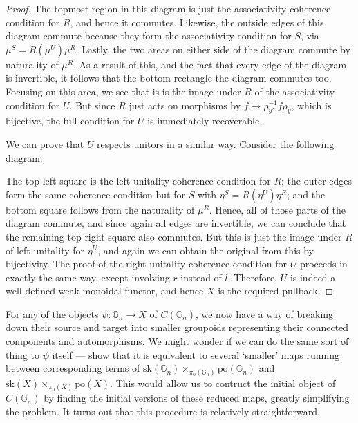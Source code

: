 \documentclass{amsart} %
\newenvironment{eq*}{\begin{equation*}}{\end{equation*}}
\begin{document}
\begin{proof}
The topmost region in this diagram is just the associativity coherence condition for $R$, and hence it commutes. Likewise, the outside edges of this diagram commute because they form the associativity condition for $S$, via $\mu^S = R(\mu^U) \mu^R$. Lastly, the two areas on either side of the diagram commute by naturality of $\mu^R$. As a result of this, and the fact that every edge of the diagram is invertible, it follows that the bottom rectangle the diagram commutes too. Focusing on this area, we see that is is the image under $R$ of the associativity condition for $U$. But since $R$ just acts on morphisms by $f \mapsto \rho_{y'}^{-1} f \rho_y$, which is bijective, the full condition for $U$ is immediately recoverable. 

We can prove that $U$ respects unitors in a similar way. Consider the following diagram:
\begin{eq*}  \end{eq*}
The top-left square is the left unitality coherence condition for $R$; the outer edges form the same coherence condition but for $S$ with $\eta^S = R(\eta^U) \eta^R$; and the bottom square follows from the naturality of $\mu^R$. Hence, all of those parts of the diagram commute, and since again all edges are invertible, we can conclude that the remaining top-right square also commutes. But this is just the image under $R$ of left unitality for $\eta^U$, and again we can obtain the original from this by bijectivity. The proof of the right unitality coherence condition for $U$ proceeds in exactly the same way, except involving $r$ instead of $l$. Therefore, $U$ is indeed a well-defined weak monoidal functor, and hence $X$ is the required pullback.
\end{proof}

For any of the objects $\psi : \mathbb{G}_n \to X$ of $C(\mathbb{G}_n)$, we now have a way of breaking down their source and target into smaller groupoids representing their connected components and automorphisms. We might wonder if we can do the same sort of thing to $\psi$ itself --- show that it is equivalent to several `smaller' maps running between corresponding terms of $\mathrm{sk}(\mathbb{G}_n) \times_{\pi_0(\mathbb{G}_n)} \mathrm{po}(\mathbb{G}_n)$ and $\mathrm{sk}(X) \times_{\pi_0(X)} \mathrm{po}(X)$. This would allow us to contruct the initial object of $C(\mathbb{G}_n)$ by finding the initial versions of these reduced maps, greatly simplifying the problem. It turns out that this procedure is relatively straightforward.
\end{document}
